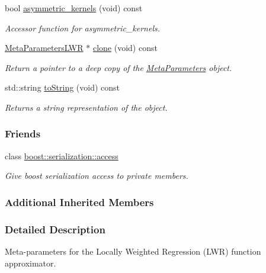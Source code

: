 \begin{DoxyCompactItemize}
bool \hyperlink{classDmpBbo_1_1MetaParametersLWR_ac56e9aa7df627ac838cb4f9d6af5a525}{asymmetric\+\_\+kernels} (void) const 
\begin{DoxyCompactList}\small\item\em Accessor function for asymmetric\+\_\+kernels. \end{DoxyCompactList}\item 
\hyperlink{classDmpBbo_1_1MetaParametersLWR}{Meta\+Parameters\+L\+W\+R} $\ast$ \hyperlink{classDmpBbo_1_1MetaParametersLWR_a4bdcb8bc45561f96baec20aa5fe4df13}{clone} (void) const 
\begin{DoxyCompactList}\small\item\em Return a pointer to a deep copy of the \hyperlink{classDmpBbo_1_1MetaParameters}{Meta\+Parameters} object. \end{DoxyCompactList}\item 
std\+::string \hyperlink{classDmpBbo_1_1MetaParametersLWR_a1aca816b42cf0d36118be0ab91120d77}{to\+String} (void) const 
\begin{DoxyCompactList}\small\item\em Returns a string representation of the object. \end{DoxyCompactList}\end{DoxyCompactItemize}
\subsubsection*{Friends}
\begin{DoxyCompactItemize}
\item 
class \hyperlink{classDmpBbo_1_1MetaParametersLWR_ac98d07dd8f7b70e16ccb9a01abf56b9c}{boost\+::serialization\+::access}
\begin{DoxyCompactList}\small\item\em Give boost serialization access to private members. \end{DoxyCompactList}\end{DoxyCompactItemize}
\subsubsection*{Additional Inherited Members}


\subsubsection{Detailed Description}
Meta-\/parameters for the Locally Weighted Regression (L\+W\+R) function approximator. 

